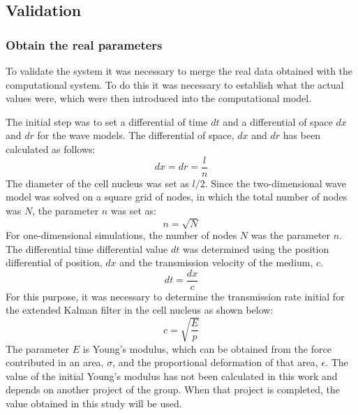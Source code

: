 \documentclass[12pt, a4paper]{article} %
\begin{document}
\setlength{\parskip}{0mm}

\subsection{Validation}

\subsubsection{Obtain the real parameters}

To validate the system it was necessary to merge the real data obtained with the computational system. To do this it was necessary to establish what the actual values were, which were then introduced into the computational model.

\setlength{\parskip}{4mm}

The initial step was to set a differential of time $dt$ and a differential of space $dx$ and $dr$ for the wave models. The differential of space, $dx$ and $dr$ has been calculated as follows:
\begin{equation} \label{eqn:dx}
	dx = dr = \frac{l}{n}
\end{equation}
The diameter of the cell nucleus was set as $l/2$. Since the two-dimensional wave model was solved on a square grid of nodes, in which the total number of nodes was $N$, the parameter $n$ was set as:
\begin{equation} \label{eqn:n}
	n = \sqrt{N}
\end{equation}
For one-dimensional simulations, the number of nodes $N$ was the parameter $n$. The differential time differential value $dt$ was determined using the position differential of position, $dx$ and the transmission velocity of the medium, $c$.
\begin{equation} \label{eqn:dt}
	dt = \frac{dx}{c}
\end{equation}
For this purpose, it was necessary to determine the transmission rate initial for the extended Kalman filter in the cell nucleus as shown below:
\begin{equation} \label{eqn:c}
	c = \sqrt{\frac{E}{p}}
\end{equation}
The parameter $E$ is Young's modulus, which can be obtained from the force contributed in an area, $\sigma$, and the proportional deformation of that area, $\epsilon$. The value of the initial Young's modulus has not been calculated in this work and depends on another project of the group. When that project is completed, the value obtained in this study will be used.
\end{document}
